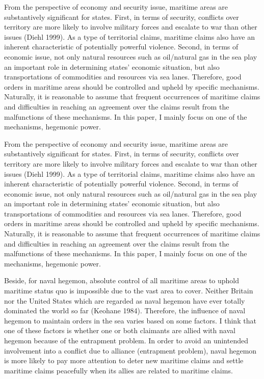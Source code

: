 \documentclass{article}
\begin{document}
From the perspective of economy and security issue, maritime areas are substantively significant for states. First, in terms of security, conflicts over territory are more likely to involve military forces and escalate to war than other issues (Diehl 1999). As a type of territorial claims, maritime claims also have an inherent characteristic of potentially powerful violence. Second, in terms of economic issue, not only natural resources such as oil/natural gas in the sea play an important role in determining states’ economic situation, but also transportations of commodities and resources via sea lanes. Therefore, good orders in maritime areas should be controlled and upheld by specific mechanisms. Naturally, it is reasonable to assume that frequent occurrences of maritime claims and difficulties in reaching an agreement over the claims result from the malfunctions of these mechanisms. In this paper, I mainly focus on one of the mechanisms, hegemonic power.  

From the perspective of economy and security issue, maritime areas are substantively significant for states. First, in terms of security, conflicts over territory are more likely to involve military forces and escalate to war than other issues (Diehl 1999). As a type of territorial claims, maritime claims also have an inherent characteristic of potentially powerful violence. Second, in terms of economic issue, not only natural resources such as oil/natural gas in the sea play an important role in determining states’ economic situation, but also transportations of commodities and resources via sea lanes. Therefore, good orders in maritime areas should be controlled and upheld by specific mechanisms. Naturally, it is reasonable to assume that frequent occurrences of maritime claims and difficulties in reaching an agreement over the claims result from the malfunctions of these mechanisms. In this paper, I mainly focus on one of the mechanisms, hegemonic power. 

Beside, for naval hegemon, absolute control of all maritime areas to uphold maritime status quo is impossible due to the vast area to cover. Neither Britain nor the United States which are regarded as naval hegemon have ever totally dominated the world so far (Keohane 1984). Therefore, the influence of naval hegemon to maintain orders in the sea varies based on some factors. I think that one of these factors is whether one or both claimants are allied with naval hegemon because of the entrapment problem. In order to avoid an unintended involvement into a conflict due to alliance (entrapment problem), naval hegemon is more likely to pay more attention to deter new maritime claims and settle maritime claims peacefully when its allies are related to maritime claims. 
\end{document}
